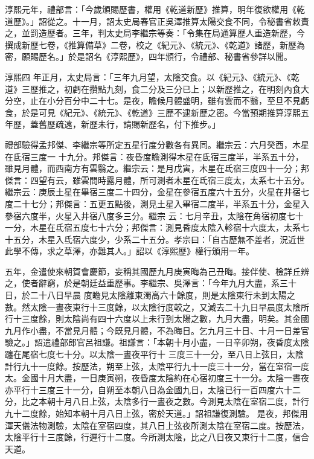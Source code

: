 \begin{pinyinscope}
 淳熙元年，禮部言：「今歲頒賜歷書，權用《乾道新歷》推算，明年復欲權用《乾道歷》。」詔從之。十一月，詔太史局春官正吳澤推算太陽交食不同，令秘書省敕責之，並罰造歷者。三年，判太史局李繼宗等奏：「令集在局通算歷人重造新歷，今撰成新歷七卷，《推算備草》二卷，校之《紀元》、《統元》、《乾道》諸歷，新歷為密，願賜歷名。」於是詔名《淳熙歷》，四年頒行，令禮部、秘書省參詳以聞。



 淳熙四
 年正月，太史局言：「三年九月望，太陰交食。以《紀元》、《統元》、《乾道》三歷推之，初虧在攢點九刻，食二分及三分已上；以新歷推之，在明刻內食大分空，止在小分百分中二十七。是夜，瞻候月體盛明，雖有雲而不翳，至旦不見虧食，於是可見《紀元》、《統元》、《乾道》三歷不逮新歷之密。今當預期推算淳熙五年歷，蓋舊歷疏遠，新歷未行，請賜新歷名，付下推步。」



 禮部驗得孟邦傑、李繼宗等所定五星行度分數各有異同。繼宗云：六月癸酉，木星在氐宿三度一
 十九分。邦傑言：夜昏度瞻測得木星在氐宿三度半，半系五十分，雖見月體，而西南方有雲翳之。繼宗云：是月戊寅，木星在氐宿三度四十一分；邦傑言：四望有云，雖雲間時露月體，所可測者木星在氐宿三度太，太系七十五分。繼宗云：庚辰土星在畢宿三度二十四分，金星在參宿五度六十五分，火星在井宿七度二十七分；邦傑言：五更五點後，測見土星入畢宿二度半，半系五十分，金星入參宿六度半，火星入井宿八度多三分。繼宗
 云：七月辛丑，太陰在角宿初度七十一分，木星在氐宿五度七十六分；邦傑言：測見昏度太陰入軫宿十六度太，太系七十五分，木星入氐宿六度少，少系二十五分。孝宗曰：「自古歷無不差者，況近世此學不傳，求之草澤，亦難其人。」詔以《淳熙歷》權行頒用一年。



 五年，金遣使來朝賀會慶節，妄稱其國歷九月庚寅晦為己丑晦。接伴使、檢詳丘辨之，使者辭窮，於是朝廷益重歷事。李繼宗、吳澤言：「今年九月大盡，系三十日，於二十八日早晨
 度瞻見太陰離東濁高六十餘度，則是太陰東行未到太陽之數。然太陰一晝夜東行十三度餘，以太陰行度較之，又減去二十九日早晨度太陰所行十三度餘，則太陰尚有四十六度以上未行到太陽之數，九月大盡，明矣。其金國九月作小盡，不當見月體；今既見月體，不為晦日。乞九月三十日、十月一日差官驗之。」詔遣禮部郎官呂祖謙。祖謙言：「本朝十月小盡，一日辛卯朔，夜昏度太陰躔在尾宿七度七十分。以太陰一晝夜平行十
 三度三十一分，至八日上弦日，太陰計行九十一度餘。按歷法，朔至上弦，太陰平行九十一度三十一分，當在室宿一度太。金國十月大盡，一日庚寅朔，夜昏度太陰約在心宿初度三十一分。太陰一晝夜亦平行十三度三十一分，自朔至本朝八日為金國九日，太陰已行一百四度六十二分，比之本朝十月八日上弦，太陰多行一晝夜之數。今測見太陰在室宿二度，計行九十二度餘，始知本朝十月八日上弦，密於天道。」詔祖謙復測驗。
 是夜，邦傑用渾天儀法物測驗，太陰在室宿四度，其八日上弦夜所測太陰在室宿二度。按歷法，太陰平行十三度餘，行遲行十二度。今所測太陰，比之八日夜又東行十二度，信合天道。




\end{pinyinscope}

